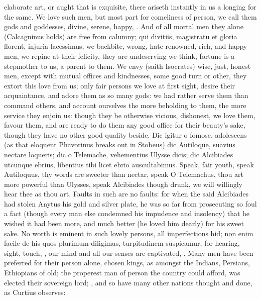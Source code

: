 {elaborate art, or aught that is exquisite, there ariseth instantly in
us a longing for the same. We love such men, but most part for
comeliness of person, we call them gods and goddesses, divine, serene,
happy, \etc{}. And of all mortal men they alone (Calcagninus holds)
are free from calumny; qui divitiis, magistratu et gloria florent,
injuria lacessimus, we backbite, wrong, hate renowned, rich, and happy
men, we repine at their felicity, they are undeserving we think,
fortune is a stepmother to us, a parent to them. We envy (saith
Isocrates) wise, just, honest men, except with mutual offices and
kindnesses, some good turn or other, they extort this love from us;
only fair persons we love at first sight, desire their acquaintance,
and adore them as so many gods: we had rather serve them than command
others, and account ourselves the more beholding to them, the more
service they enjoin us: though they be otherwise vicious, dishonest, we
love them, favour them, and are ready to do them any good office for
their beauty's sake, though they have no other good quality
beside. Dic igitur o fomose, adolescens (as that eloquent Phavorinus
breaks out in Stobeus) dic Autiloque, suavius nectare loqueris;
dic o Telemache, vehementius Ulysse dicis; dic Alcibiades utcunque
ebrius, libentius tibi licet ebrio auscultabimus. Speak, fair youth,
speak Autiloquus, thy words are sweeter than nectar, speak O
Telemachus, thou art more powerful than Ulysses, speak Alcibiades
though drunk, we will willingly hear thee as thou art. Faults in such
are no faults: for when the said Alcibiades had stolen Anytus his gold
and silver plate, he was so far from prosecuting so foul a fact (though
every man else condemned his impudence and insolency) that he wished it
had been more, and much better (he loved him dearly) for his sweet
sake. No worth is eminent in such lovely persons, all imperfections
hid; non enim facile de his quos plurimum diligimus, turpitudinem
suspicamur, for hearing, sight, touch, \etc{}, our mind and all our senses
are captivated, . Many men have been
preferred for their person alone, chosen kings, as amongst the Indians,
Persians, Ethiopians of old; the properest man of person the country
could afford, was elected their sovereign lord; , and so have many other nations thought
and done, as Curtius observes: }
